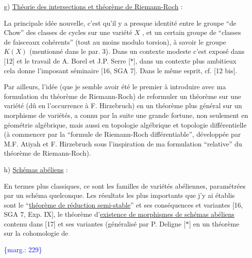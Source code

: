 \documentclass[11pt]{article}
\newcommand{\scanpage}[1]{\par\bigskip\noindent{\small\sffamily[scan #1]}\par}
\newcommand{\mspage}[1]{{\small\sffamily[p.\,#1]}}
\newcommand{\hand}[1]{\textcolor{blue}{#1}}
\newcommand{\margin}[1]{\textcolor{blue}{\{\textsf{marg.:} #1\}}}
\newcommand{\uline}[1]{\underline{#1}}
\begin{document}
\mspage{\hand{228}}

\clearpage
\scanpage{119/229}
\mspage{. 16 .}

g) \uline{Théorie des intersections et théorème de Riemann-Roch} :

La principale idée nouvelle, c'est qu'il y
a presque identité entre le groupe ``de Chow'' des
classes de cycles sur une variété $X$ , et un certain
groupe de ``classes de faisceaux cohérents'' (tout au
moins modulo torsion), à savoir le groupe $K(X)$
(mentionné dans le par. 3). Dans un contexte modeste
c'est exposé dans [12] et le travail de A. Borel et
J.P. Serre [$*$], dans un contexte plus ambitieux cela
donne l'imposant séminaire [16, SGA 7]. Dans le même
esprit, cf. [12 bis].

Par ailleurs, l'idée (que je semble avoir été
le premier à introduire avec ma formulation du théorème
de Riemann-Roch) de reformuler un théorème sur une
variété (dû en l'occurrence à F. Hirzebruch) en un
théorème plus général sur un morphisme de variétés, a
connu par la suite une grande fortune, non seulement
en géométrie algébrique, mais aussi en topologie
algébrique et topologie différentielle (à commencer par
la ``formule de Riemann-Roch différentiable'', développée
par M.F. Atiyah et F. Hirzebruch sous l'inspiration de
ma formulation ``relative'' du théorème de Riemann-Roch).

h) \uline{Schémas abéliens} :

En termes plus classiques, ce sont les familles
de variétés abéliennes, paramétrées par un schéma
quelconque. Les résultats les plus importants que j'y
ai établis sont le ``\uline{théorème de réduction semi-stable}''
et ses conséquences et variantes [16, SGA 7, Exp. IX],
le théorème d'\uline{existence de morphismes de schémas abéliens}
contenu dans [17] et ses variantes (généralisé par
P. Deligne [$*$] en un théorème sur la cohomologie de

\margin{229}

\clearpage
\scanpage{119/230}
\mspage{. 17 .}
\end{document}
